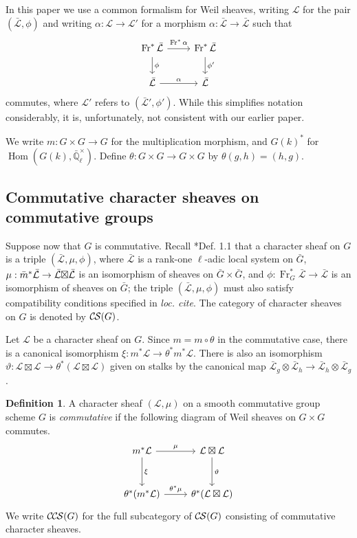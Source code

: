 \documentclass[10pt]{amsart}
\theoremstyle{plain}
\theoremstyle{definition}
\newtheorem{definition}[theorem]{Definition}
\newcommand{\EE}{\mathbb{\bar Q}_\ell}
\newcommand{\EEx}{\EE^\times}
\newcommand{\Frob}[1]{\operatorname{Fr}_{#1}}
\DeclareMathOperator{\Hom}{Hom}
\newcommand{\cs}[1]{{\mathcal{#1}}}
\newcommand{\gcs}[1]{{\mathcal{\bar #1}}}
\newcommand{\CS}{{\mathcal{C\hskip-0.8pt S}}}
\newcommand{\CCS}{{\mathcal{C\hskip-.8pt C\hskip-0.8pt S}}}
\newcommand{\bm}{\bar{m}}
\newcommand{\bG}{\bar{G}}
\newcommand{\tight}[3]{\hspace{-#1pt}{#2}\hspace{-#3pt}}
\newcommand{\LxL}{\text{$\gcs{L} \tight{0}{\boxtimes}{0} \gcs{L}$}}
\begin{document}
In this paper we use a common formalism for Weil sheaves, writing $\cs{L}$ for the pair $(\gcs{L},\phi)$ and writing $\alpha : \cs{L} \to \cs{L}'$ for a morphism $\alpha : \gcs{L} \to \gcs{L}$ such that 
\[
\begin{tikzcd}
\Frob{}^* \gcs{L} \arrow{d}{\phi} \arrow{r}{\Frob{}^*\alpha} &  \Frob{}^* \gcs{L} \arrow{d}{\phi'}\\
\gcs{L} \arrow{r}{\alpha} & \gcs{L}
\end{tikzcd}
\]
commutes, where $\cs{L}'$ refers to $(\gcs{L}',\phi')$.
While this simplifies notation considerably, it is, unfortunately, not consistent with our earlier paper.

We write $m : G \times G \to G$ for the multiplication morphism, and $G(k)^*$ for $\Hom(G(k), \EEx)$.
Define $\theta : G\times G \to G\times G$ by $\theta(g,h) = (h,g)$.

\subsection{Commutative character sheaves on commutative groups}

Suppose now that $G$ is commutative.
Recall \cite{cunningham-roe:13a}*{Def. 1.1} that a character sheaf on $G$ is a triple $(\gcs{L}, \mu, \phi)$,
where $\gcs{L}$ is a rank-one $\ell$-adic local system on $\bG$, 
$\mu : \bm^* \gcs{L} \to \LxL$ is an isomorphism
of sheaves on $\bG \times \bG$, 
and $\phi : \Frob{G}^* \gcs{L} \to \gcs{L}$ is an isomorphism of sheaves on $\bG$;
the triple $(\gcs{L}, \mu, \phi)$ must also satisfy compatibility conditions specified in \emph{loc. cite}.
The category of character sheaves on $G$ is denoted by $\CS(G)$.

Let $\cs{L}$ be a character sheaf on $G$.  Since $m = m \circ \theta$ in the commutative case,
there is a canonical isomorphism $\xi : m^* \cs{L} \to \theta^* m^* \cs{L}$.
There is also an isomorphism $\vartheta : \cs{L}\boxtimes\cs{L} \to \theta^*(\cs{L}\boxtimes\cs{L})$
given on stalks by the canonical map $\gcs{L}_{g} \otimes \gcs{L}_{h} \to \gcs{L}_{h} \otimes \gcs{L}_{g}$.

\begin{definition}\label{def:CCScom}
A character sheaf $(\cs{L}, \mu)$ on a smooth commutative group scheme $G$ is \emph{commutative}
if the following diagram of Weil sheaves on $G \times G$ commutes.
  \[
  \begin{tikzcd}[row sep=30]
   m^*\cs{L} \arrow{d}{\xi} \arrow{r}{\mu} & \cs{L}\boxtimes\cs{L} \arrow{d}{\vartheta}\\
   \theta^*(m^*\cs{L}) \arrow{r}{{\theta}^*\mu} &  \theta^*(\cs{L}\boxtimes\cs{L})
  \end{tikzcd}
  \]
We write $\CCS(G)$ for the full subcategory of $\CS(G)$ consisting of commutative character sheaves.
 \end{definition}
\end{document}
